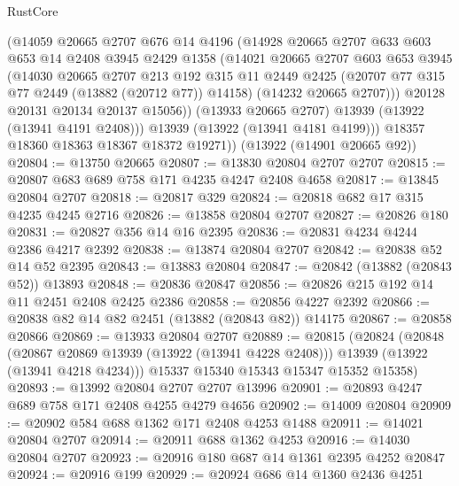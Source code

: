 \begin{lexlean}{RustCore}
\begin{coremodule}
            (@14059
              @20665
              @2707
              @676
              @14
              @4196
              (@14928
                @20665
                @2707
                @633
                @603
                @653
                @14
                @2408
                @3945
                @2429
                @1358
                (@14021
                  @20665
                  @2707
                  @603
                  @653
                  @3945
                  (@14030
                    @20665
                    @2707
                    @213
                    @192
                    @315
                    @11
                    @2449
                    @2425
                    (@20707 @77 @315 @77 @2449 (@13882 (@20712 @77)) @14158)
                    (@14232 @20665 @2707)))
                @20128
                @20131
                @20134
                @20137
                @15056))
            (@13933 @20665 @2707)
            @13939
            (@13922 (@13941 @4191 @2408)))
          @13939
          (@13922 (@13941 @4181 @4199)))
        @18357
        @18360
        @18363
        @18367
        @18372
        @19271))
    (@13922 (@14901 @20665 @92))
@20804 := @13750 @20665
@20807 := @13830 @20804 @2707 @2707
@20815 := @20807 @683 @689 @758 @171 @4235 @4247 @2408 @4658
@20817 := @13845 @20804 @2707
@20818 := @20817 @329
@20824 := @20818 @682 @17 @315 @4235 @4245 @2716
@20826 := @13858 @20804 @2707
@20827 := @20826 @180
@20831 := @20827 @356 @14 @16 @2395
@20836 := @20831 @4234 @4244 @2386 @4217 @2392
@20838 := @13874 @20804 @2707
@20842 := @20838 @52 @14 @52 @2395
@20843 := @13883 @20804
@20847 := @20842 (@13882 (@20843 @52)) @13893
@20848 := @20836 @20847
@20856 := @20826 @215 @192 @14 @11 @2451 @2408 @2425 @2386
@20858 := @20856 @4227 @2392
@20866 := @20838 @82 @14 @82 @2451 (@13882 (@20843 @82)) @14175
@20867 := @20858 @20866
@20869 := @13933 @20804 @2707
@20889 := @20815
    (@20824
      (@20848
        (@20867 @20869 @13939 (@13922 (@13941 @4228 @2408)))
        @13939
        (@13922 (@13941 @4218 @4234)))
      @15337
      @15340
      @15343
      @15347
      @15352
      @15358)
@20893 := @13992 @20804 @2707 @2707 @13996
@20901 := @20893 @4247 @689 @758 @171 @2408 @4255 @4279 @4656
@20902 := @14009 @20804
@20909 := @20902 @584 @688 @1362 @171 @2408 @4253 @1488
@20911 := @14021 @20804 @2707
@20914 := @20911 @688 @1362 @4253
@20916 := @14030 @20804 @2707
@20923 := @20916 @180 @687 @14 @1361 @2395 @4252 @20847
@20924 := @20916 @199
@20929 := @20924 @686 @14 @1360 @2436 @4251

\end{coremodule}
\end{lexlean}
